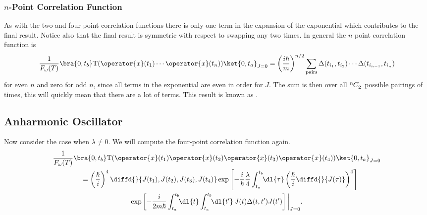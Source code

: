 \documentclass[fleqn]{NotesClass}
\newcommand*{\timeorder}{\mathrm{T}}
\begin{document}
    \subsubsection{\(n\)-Point Correlation Function}
    As with the two and four-point correlation functions there is only one term in the expansion of the exponential which contributes to the final result.
    Notice also that the final result is symmetric with respect to swapping any two times.
    In general the \(n\) point correlation function is
    \begin{equation*}
        \frac{1}{F_{\omega}(T)} \bra{0, t_b} \timeorder(\operator{x}(t_1) \dotsm \operator{x}(t_n)) \ket{0, t_a}_{J = 0} = \left( \frac{i\hbar}{m} \right)^{n/2} \sum_{\text{pairs}} \Delta(t_{i_1}, t_{i_2}) \dotsm \Delta(t_{i_{n-1}}, t_{i_n})
    \end{equation*}
    for even \(n\) and zero for odd \(n\), since all terms in the exponential are even in order for \(J\).
    The sum is then over all \(\tensor[^n]{C}{_2}\) possible pairings of times, this will quickly mean that there are a lot of terms.
    This result is known as .
    
    \subsection{Anharmonic Oscillator}
    Now consider the case when \(\lambda \ne 0\).
    We will compute the four-point correlation function again.
    \begin{multline}
        \frac{1}{F_{\omega}(T)} \bra{0, t_b} \timeorder (\operator{x}(t_1)\operator{x}(t_2)\operator{x}(t_3)\operator{x}(t_4)) \ket{0, t_a}_{J=0}\\
        \quad= \left( \frac{\hbar}{i} \right)^4 \diffd{}{J(t_1),J(t_2),J(t_3),J(t_4)} \exp\left[ -\frac{i}{\hbar} \frac{\lambda}{4} \int_{t_a}^{t_b} \!\! \dl{\tau} \left( \frac{\hbar}{i} \diffd{}{J(\tau)} \right)^4 \right]\\
        \exp\left[ -\frac{i}{2m\hbar} \int_{t_a}^{t_b} \!\! \dl{t} \int_{t_a}^{t_b} \!\! \dl{t'} \, J(t)\Delta(t, t')J(t') \right] \bigg\vert_{J=0}.
    \end{multline}
    
\end{document}
